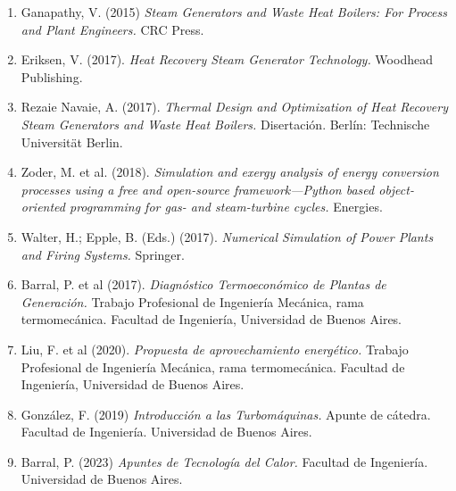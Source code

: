 \documentclass[a4paper]{article}
\begin{document}
\begin{enumerate}
\item Ganapathy, V. (2015) \textit{Steam Generators and Waste Heat Boilers: For Process and Plant Engineers.} CRC Press.

\item Eriksen, V. (2017). \textit{Heat Recovery Steam Generator Technology.} \newline Woodhead Publishing.

\item Rezaie Navaie, A. (2017). \textit{Thermal Design and Optimization of Heat Recovery Steam Generators and Waste Heat Boilers.} Disertación. Berlín: Technische Universität Berlin.

\item Zoder, M. et al. (2018). \textit{Simulation and exergy analysis of energy conversion processes using a free and open-source framework—Python based object-oriented programming for gas- and steam-turbine cycles.} Energies.

\item Walter, H.; Epple, B. (Eds.) (2017). \textit{Numerical Simulation of Power Plants and Firing Systems.} Springer.

\item Barral, P. et al (2017). \textit{Diagnóstico Termoeconómico de Plantas de Generación.} Trabajo Profesional de Ingeniería Mecánica, rama termomecánica. Facultad de Ingeniería, Universidad de Buenos Aires.

\item Liu, F. et al (2020). \textit{Propuesta de aprovechamiento energético.} Trabajo Profesional de Ingeniería Mecánica, rama termomecánica. Facultad de Ingeniería, Universidad de Buenos Aires.

\item González, F. (2019) \textit{Introducción a las Turbomáquinas.} Apunte de cátedra. Facultad de Ingeniería. Universidad de Buenos Aires.

\item Barral, P. (2023) \textit{Apuntes de Tecnología del Calor.} Facultad de Ingeniería. Universidad de Buenos Aires.

\end{enumerate}
\end{document}

